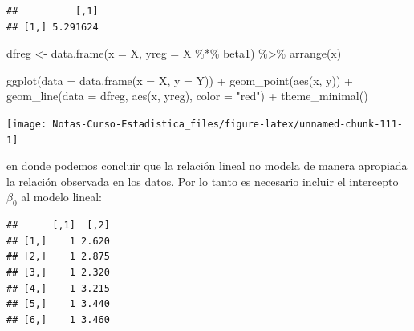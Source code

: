 \documentclass[
  12pt,
]{book}
\newenvironment{Shaded}{\begin{snugshade}}{\end{snugshade}}
\newcommand{\AttributeTok}[1]{\textcolor[rgb]{0.77,0.63,0.00}{#1}}
\newcommand{\DecValTok}[1]{\textcolor[rgb]{0.00,0.00,0.81}{#1}}
\newcommand{\FunctionTok}[1]{\textcolor[rgb]{0.00,0.00,0.00}{#1}}
\newcommand{\NormalTok}[1]{#1}
\newcommand{\OtherTok}[1]{\textcolor[rgb]{0.56,0.35,0.01}{#1}}
\newcommand{\SpecialCharTok}[1]{\textcolor[rgb]{0.00,0.00,0.00}{#1}}
\newcommand{\StringTok}[1]{\textcolor[rgb]{0.31,0.60,0.02}{#1}}
\theoremstyle{definition}
\theoremstyle{definition}
\theoremstyle{definition}
\theoremstyle{definition}
\theoremstyle{remark}
\begin{document}
\begin{verbatim}
##          [,1]
## [1,] 5.291624
\end{verbatim}

\begin{Shaded}
\begin{Highlighting}[]
\NormalTok{dfreg }\OtherTok{\textless{}{-}} \FunctionTok{data.frame}\NormalTok{(}\AttributeTok{x =}\NormalTok{ X, }\AttributeTok{yreg =}\NormalTok{ X }\SpecialCharTok{\%*\%}\NormalTok{ beta1) }\SpecialCharTok{\%\textgreater{}\%}
    \FunctionTok{arrange}\NormalTok{(x)}
\end{Highlighting}
\end{Shaded}

\begin{Shaded}
\begin{Highlighting}[]
\FunctionTok{ggplot}\NormalTok{(}\AttributeTok{data =} \FunctionTok{data.frame}\NormalTok{(}\AttributeTok{x =}\NormalTok{ X, }\AttributeTok{y =}\NormalTok{ Y)) }\SpecialCharTok{+} \FunctionTok{geom\_point}\NormalTok{(}\FunctionTok{aes}\NormalTok{(x,}
\NormalTok{    y)) }\SpecialCharTok{+} \FunctionTok{geom\_line}\NormalTok{(}\AttributeTok{data =}\NormalTok{ dfreg, }\FunctionTok{aes}\NormalTok{(x, yreg), }\AttributeTok{color =} \StringTok{"red"}\NormalTok{) }\SpecialCharTok{+}
    \FunctionTok{theme\_minimal}\NormalTok{()}
\end{Highlighting}
\end{Shaded}

\begin{center}\texttt{[image: Notas-Curso-Estadistica\_files/figure-latex/unnamed-chunk-111-1]} \end{center}

en donde podemos concluir que la relación lineal no modela de manera apropiada la relación observada en los datos. Por lo tanto es necesario incluir el intercepto \(\beta_0\) al modelo lineal:

\begin{Shaded}
\end{Shaded}

\begin{verbatim}
##      [,1]  [,2]
## [1,]    1 2.620
## [2,]    1 2.875
## [3,]    1 2.320
## [4,]    1 3.215
## [5,]    1 3.440
## [6,]    1 3.460
\end{verbatim}
\end{document}
